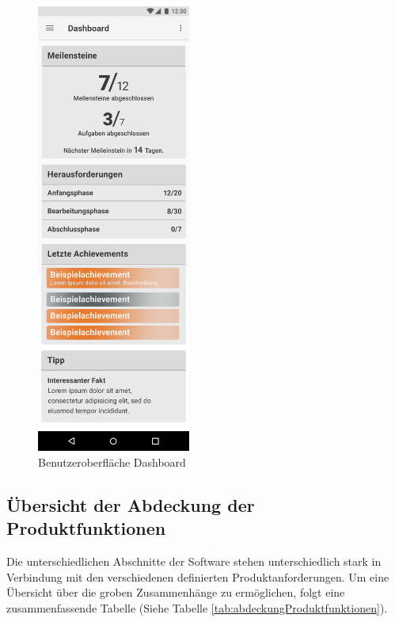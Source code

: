\documentclass{scrreprt}
\begin{document}
\begin{figure}[H]
	\centering
	\includegraphics[width=0.45\textwidth,keepaspectratio]{Bilder/Prototyp/Dashboard.png}
	\caption{Benutzeroberfläche Dashboard}
	\label{img:dashboard}
\end{figure}


\newpage
\subsection{Übersicht der Abdeckung der Produktfunktionen}
\par Die unterschiedlichen Abschnitte der Software stehen unterschiedlich stark in Verbindung mit den verschiedenen definierten Produktanforderungen. Um eine Übersicht über die groben Zusammenhänge zu ermöglichen, folgt eine zusammenfassende Tabelle (Siehe Tabelle \ref{tab:abdeckungProduktfunktionen}).
\bigskip
\end{document}
